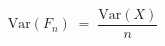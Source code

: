 \documentclass[preview]{standalone}
\begin{document}
\begin{align*}
\mathrm{Var}(F_n) \;=\; \dfrac{\mathrm{Var}(X)}{n}
\end{align*}
\end{document}
